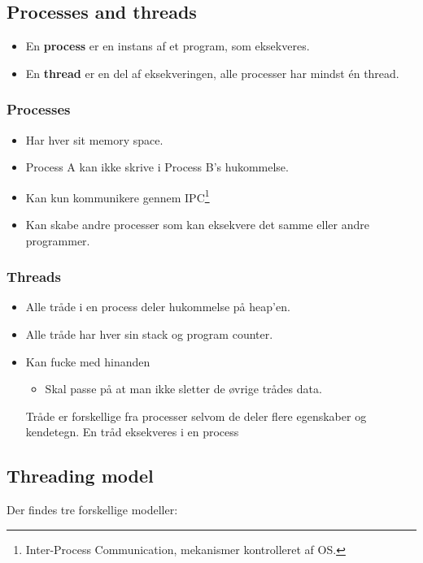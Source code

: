 \newpage

\subsection{Processes and threads}
\begin{itemize}
	\item En \textbf{process} er en instans af et program, som eksekveres.
	\item En \textbf{thread} er en del af eksekveringen, alle processer har mindst én thread.
\end{itemize}

\subsubsection*{Processes}
\begin{itemize}
	\item Har hver sit memory space.
	\item Process A kan ikke skrive i Process B's hukommelse.
	\item Kan kun kommunikere gennem IPC\footnote{Inter-Process Communication, mekanismer kontrolleret af OS.}
	\item Kan skabe andre processer som kan eksekvere det samme eller andre programmer.
\end{itemize}

\subsubsection*{Threads}
\begin{itemize}
	\item Alle tråde i en process deler hukommelse på heap'en.
	\item Alle tråde har hver sin stack og program counter.
	\item Kan fucke med hinanden
	\begin{itemize}
		\item Skal passe på at man ikke sletter de øvrige trådes data.
	\end{itemize}
	Tråde er forskellige fra processer selvom de deler flere egenskaber og kendetegn. En tråd eksekveres i en process
\end{itemize}

\subsection{Threading model}
Der findes tre forskellige modeller:

